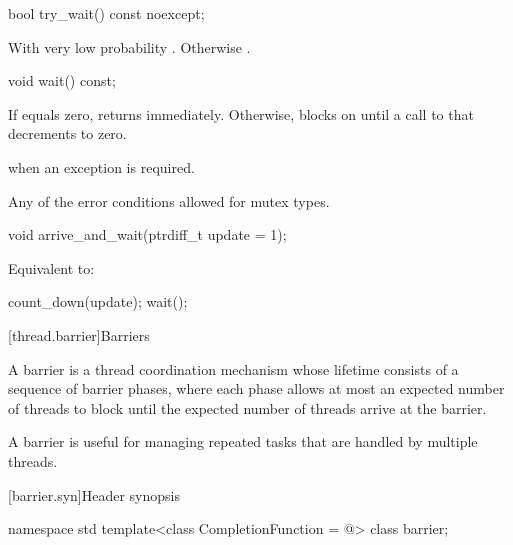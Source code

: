 %
\begin{itemdecl}
bool try_wait() const noexcept;
\end{itemdecl}

\begin{itemdescr}
\pnum
\returns
With very low probability . Otherwise .
\end{itemdescr}

%
\begin{itemdecl}
void wait() const;
\end{itemdecl}

\begin{itemdescr}
\pnum
{}%
\effects
If  equals zero, returns immediately.
Otherwise, blocks on 
until a call to  that decrements  to zero.

\pnum
\throws
{} when an exception is required.

\pnum
\errors
Any of the error conditions
allowed for mutex types.
\end{itemdescr}

%
\begin{itemdecl}
void arrive_and_wait(ptrdiff_t update = 1);
\end{itemdecl}

\begin{itemdescr}
\pnum
\effects
Equivalent to:
\begin{codeblock}
count_down(update);
wait();
\end{codeblock}
\end{itemdescr}

[thread.barrier]{Barriers}

\pnum
A barrier is a thread coordination mechanism
whose lifetime consists of a sequence of barrier phases,
where each phase allows at most an expected number of threads to block
until the expected number of threads arrive at the barrier.
\begin{note}
A barrier is useful for managing repeated tasks
that are handled by multiple threads.
\end{note}

[barrier.syn]{Header  synopsis}

%
\begin{codeblock}
namespace std {
  template<class CompletionFunction = @\seebelow@>
    class barrier;
}
\end{codeblock}

